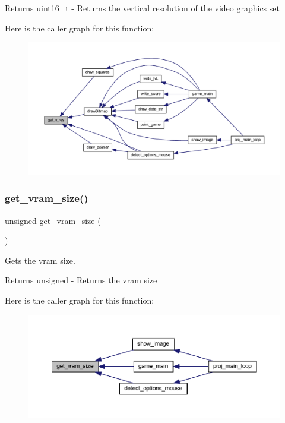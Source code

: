 \begin{DoxyReturn}{Returns}
uint16\+\_\+t -\/ Returns the vertical resolution of the video graphics set 
\end{DoxyReturn}
Here is the caller graph for this function\+:
\nopagebreak
\begin{figure}[H]
\begin{center}
\leavevmode
\includegraphics[width=350pt]{group__videog_ga8ecfc1971f8bce697d1e02ebf57e6801_icgraph}
\end{center}
\end{figure}
\mbox{\label{group__videog_ga0a3c7d7f5ab9ad65df3f52a43354c5f7}} 
\subsubsection{\texorpdfstring{get\+\_\+vram\+\_\+size()}{get\_vram\_size()}}
{\footnotesize\ttfamily unsigned get\+\_\+vram\+\_\+size (\begin{DoxyParamCaption}{ }\end{DoxyParamCaption})}



Gets the vram size. 

\begin{DoxyReturn}{Returns}
unsigned -\/ Returns the vram size 
\end{DoxyReturn}
Here is the caller graph for this function\+:
\nopagebreak
\begin{figure}[H]
\begin{center}
\leavevmode
\includegraphics[width=350pt]{group__videog_ga0a3c7d7f5ab9ad65df3f52a43354c5f7_icgraph}
\end{center}
\end{figure}
\mbox{\label{group__videog_ga442a8d042167564d8248fcd57de6b837}} 
